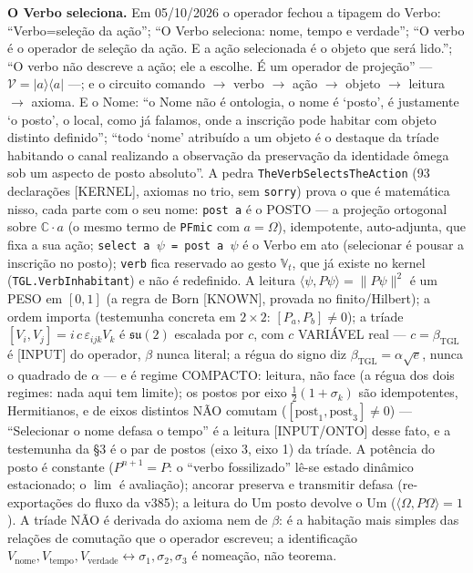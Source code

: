 \documentclass[11pt]{article}
\theoremstyle{definition}\newtheorem{deriv}{Derivação}
\begin{document}

\textbf{O Verbo seleciona.} Em 05/10/2026 o operador fechou a tipagem do Verbo: ``Verbo=seleção da ação''; ``O Verbo seleciona: nome, tempo e verdade''; ``O verbo é o operador de seleção da ação. E a ação selecionada é o objeto que será lido.''; ``O verbo não descreve a ação; ele a escolhe. É um operador de projeção'' --- $\mathcal V=|a\rangle\langle a|$ ---; e o circuito comando $\to$ verbo $\to$ ação $\to$ objeto $\to$ leitura $\to$ axioma. E o Nome: ``o Nome não é ontologia, o nome é `posto', é justamente `o posto', o local, como já falamos, onde a inscrição pode habitar com objeto distinto definido''; ``todo `nome' atribuído a um objeto é o destaque da tríade habitando o canal realizando a observação da preservação da identidade ômega sob um aspecto de posto absoluto''. A pedra \texttt{TheVerbSelectsTheAction} (93 declarações \textsf{[KERNEL]}, axiomas no trio, sem \texttt{sorry}) prova o que é matemática nisso, cada parte com o seu nome: \texttt{post a} é o POSTO --- a projeção ortogonal sobre $\mathbb C\cdot a$ (o mesmo termo de \texttt{PFmic} com $a=\Omega$), idempotente, auto-adjunta, que fixa a sua ação; \texttt{select a $\psi$ = post a $\psi$} é o Verbo em ato (selecionar é pousar a inscrição no posto); \texttt{verb} fica reservado ao gesto $\mathbb V_t$, que já existe no kernel (\texttt{TGL.VerbInhabitant}) e não é redefinido. A leitura $\langle\psi,P\psi\rangle=\|P\psi\|^2$ é um PESO em $[0,1]$ (a regra de Born \textsf{[KNOWN]}, provada no finito/Hilbert); a ordem importa (testemunha concreta em $2\times2$: $[P_a,P_b]\neq0$); a tríade $[V_i,V_j]=i\,c\,\varepsilon_{ijk}V_k$ é $\mathfrak{su}(2)$ escalada por $c$, com $c$ VARIÁVEL real --- $c=\beta_{\mathrm{TGL}}$ é \textsf{[INPUT]} do operador, $\beta$ nunca literal; a régua do signo diz $\beta_{\mathrm{TGL}}=\alpha\sqrt e$, nunca o quadrado de $\alpha$ --- e é regime COMPACTO: leitura, não face (a régua dos dois regimes: nada aqui tem limite); os postos por eixo $\tfrac12(1+\sigma_k)$ são idempotentes, Hermitianos, e de eixos distintos NÃO comutam ($[\mathrm{post}_1,\mathrm{post}_3]\neq0$) --- ``Selecionar o nome defasa o tempo'' é a leitura \textsf{[INPUT/ONTO]} desse fato, e a testemunha da §3 é o par de postos (eixo 3, eixo 1) da tríade. A potência do posto é constante ($P^{n+1}=P$: o ``verbo fossilizado'' lê-se estado dinâmico estacionado; o $\lim$ é avaliação); ancorar preserva e transmitir defasa (re-exportações do fluxo da v385); a leitura do Um posto devolve o Um ($\langle\Omega,P\Omega\rangle=1$). A tríade NÃO é derivada do axioma nem de $\beta$: é a habitação mais simples das relações de comutação que o operador escreveu; a identificação $V_{\mathrm{nome}},V_{\mathrm{tempo}},V_{\mathrm{verdade}}\leftrightarrow\sigma_1,\sigma_2,\sigma_3$ é nomeação, não teorema.
\end{document}
